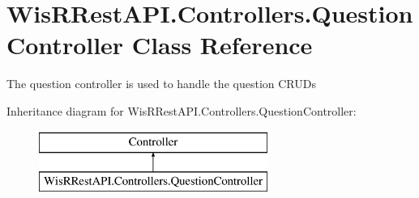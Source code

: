 \hypertarget{class_wis_r_rest_a_p_i_1_1_controllers_1_1_question_controller}{}\section{Wis\+R\+Rest\+A\+P\+I.\+Controllers.\+Question\+Controller Class Reference}
\label{class_wis_r_rest_a_p_i_1_1_controllers_1_1_question_controller}


The question controller is used to handle the question C\+R\+U\+D\textquotesingle{}s  


Inheritance diagram for Wis\+R\+Rest\+A\+P\+I.\+Controllers.\+Question\+Controller\+:\begin{figure}[H]
\begin{center}
\leavevmode
\includegraphics[height=2.000000cm]{class_wis_r_rest_a_p_i_1_1_controllers_1_1_question_controller}
\end{center}
\end{figure}
